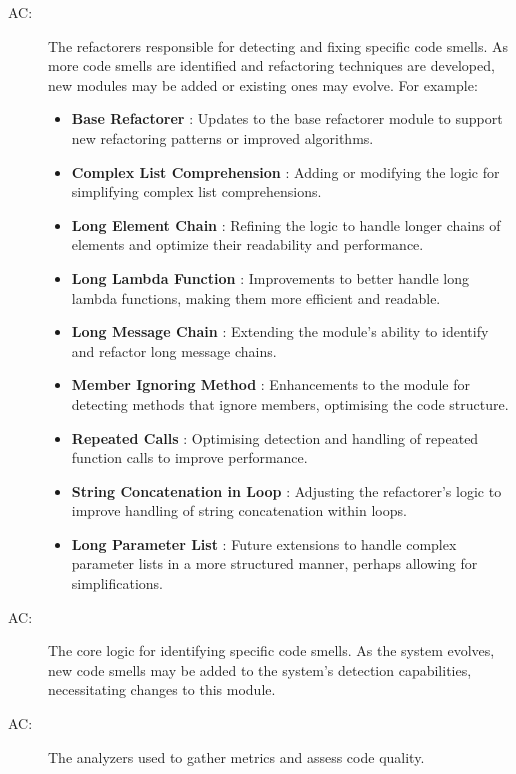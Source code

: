 \documentclass[12pt, titlepage]{article}
\newcounter{acnum}
\newcommand{\actheacnum}{AC\theacnum}
\begin{document}
\begin{description}
  \item[ \actheacnum \label{acRefactorers}:] The refactorers responsible
    for detecting and fixing specific code smells. As more code smells are identified
    and refactoring techniques are developed, new modules may be added or existing
    ones may evolve. For example:
    \begin{itemize}
      \item \textbf{Base Refactorer} \label{acBaseRefactorer}: Updates to the base refactorer module to
      support new refactoring patterns or improved algorithms.
      \item \textbf{Complex List Comprehension} \label{acComplexListComprehension}: Adding or modifying
      the logic for simplifying complex list comprehensions.
      \item \textbf{Long Element Chain} \label{acLongElementChain}: Refining the logic to handle longer
      chains of elements and optimize their readability and performance.
      \item \textbf{Long Lambda Function} \label{acLongLambdaFunction}: Improvements to better handle
      long lambda functions, making them more efficient and readable.
      \item \textbf{Long Message Chain} \label{acLongMessageChain}: Extending the module's ability
      to identify and refactor long message chains.
      \item \textbf{Member Ignoring Method} \label{acMemberIgnoringMethod}: Enhancements to the
      module for detecting methods that ignore members, optimising the code structure.
      \item \textbf{Repeated Calls} \label{acRepeatedCalls}: Optimising detection and handling
      of repeated function calls to improve performance.
      \item \textbf{String Concatenation in Loop} \label{acStringConcatenationInLoop}: Adjusting
      the refactorer's logic to improve handling of string concatenation within loops.
      \item \textbf{Long Parameter List} \label{acLongParameterList}: Future extensions to handle
      complex parameter lists in a more structured manner, perhaps allowing for simplifications.
    \end{itemize}
    
  \item[ \actheacnum \label{acSmell}:] The core logic
    for identifying specific code smells. As the system evolves, new code smells may be added to the system’s detection capabilities, necessitating changes to this module.
  
  \item[ \actheacnum \label{acAnalyzer}:] The analyzers used to
    gather metrics and assess code quality.
  
\end{description}  
\end{document}
